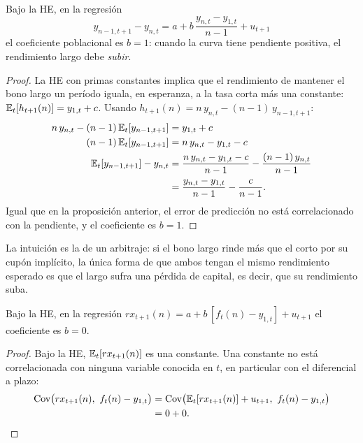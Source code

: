 \begin{proposicion}\label{prop:he2}
Bajo la HE, en la regresión
\[
  y_{n-1,t+1}-y_{n,t}=a+b\,\frac{y_{n,t}-y_{1,t}}{n-1}+u_{t+1}
\]
el coeficiente poblacional es $b=1$: cuando la curva tiene pendiente positiva, el rendimiento largo debe \emph{subir}.
\end{proposicion}

\begin{proof}
La HE con primas constantes implica que el rendimiento de mantener el bono largo un período iguala, en esperanza, a la
tasa corta más una constante: $\mathbb{E}_t[h_{t+1}(n)]=y_{1,t}+c$. Usando $h_{t+1}(n)=n\,y_{n,t}-(n-1)\,y_{n-1,t+1}$:
\begin{align*}
  n\,y_{n,t}-(n-1)\,\mathbb{E}_t[y_{n-1,t+1}] &= y_{1,t}+c\\
  (n-1)\,\mathbb{E}_t[y_{n-1,t+1}]            &= n\,y_{n,t}-y_{1,t}-c\\
  \mathbb{E}_t[y_{n-1,t+1}]-y_{n,t}           &= \frac{n\,y_{n,t}-y_{1,t}-c}{n-1}-\frac{(n-1)\,y_{n,t}}{n-1}\\
                                      &= \frac{y_{n,t}-y_{1,t}}{n-1}-\frac{c}{n-1}.
\end{align*}
Igual que en la proposición anterior, el error de predicción no está correlacionado con la pendiente, y el coeficiente
es $b=1$.
\end{proof}

La intuición es la de un arbitraje: si el bono largo rinde más que el corto por su cupón implícito, la única forma de
que ambos tengan el mismo rendimiento esperado es que el largo sufra una pérdida de capital, es decir, que su rendimiento
suba.

\begin{corolario}\label{cor:fb}
Bajo la HE, en la regresión $rx_{t+1}(n)=a+b\,[f_t(n)-y_{1,t}]+u_{t+1}$ el coeficiente es $b=0$.
\end{corolario}

\begin{proof}
Bajo la HE, $\mathbb{E}_t[rx_{t+1}(n)]$ es una constante. Una constante no está correlacionada con ninguna variable conocida en
$t$, en particular con el diferencial a plazo:
\begin{align*}
  \operatorname{Cov}\bigl(rx_{t+1}(n),\ f_t(n)-y_{1,t}\bigr) &= \operatorname{Cov}\bigl(\mathbb{E}_t[rx_{t+1}(n)]+u_{t+1},\ f_t(n)-y_{1,t}\bigr)\\
                                               &= 0+0 .
\end{align*}
\end{proof}

